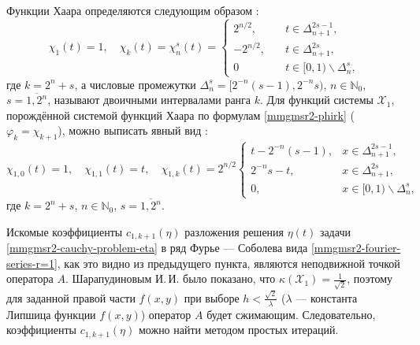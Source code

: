 Функции Хаара определяются следующим образом \cite{mmgmsr2-Kashin}:
\begin{equation}\label{mmgmsr2-haar-system}
\chi_1(t) = 1, \quad
\chi_k(t) = \chi_n^s(t)=
\begin{cases}
2^{n/2}, & \quad t \in \Delta^{2s-1}_{n+1}, \\
-2^{n/2}, & \quad t \in \Delta^{2s}_{n+1}, \\
0 & \quad t \in [0,1) \backslash \Delta^{s}_{n},
\end{cases}
\end{equation}
где $k=2^n+s$, а числовые промежутки $\Delta^{s}_n = [2^{-n}(s - 1), 2^{-n}s)$, $n \in \mathbb{N}_0$, $s = \overline{1, 2^n}$, называют двоичными интервалами ранга $k$. Для функций системы $\mathcal{X}_1$, порождённой системой функций Хаара по формулам \eqref{mmgmsr2-phirk} ($\varphi_k=\chi_{k+1}$), можно выписать явный вид \cite{mmgmsr2-SharapudinovMuratova,mmgmsr2-SHII-MSR-Demi2017}:
\begin{equation}\label{mmgmsr2-haar-sob-system}
\chi_{1,0}(t)=1, \quad
\chi_{1,1}(t)=t, \quad
\chi_{1,k}(t)=2^{n/2}
\begin{cases} %
t-2^{-n}(s-1), & x \in \Delta^{2s-1}_{n+1}, \\
2^{-n}s-t, & x \in \Delta^{2s}_{n+1}, \\
0, & x \in [0, 1)\backslash \Delta^{s}_{n}, %
\end{cases}
\end{equation}
где $k = 2^n+s$, $n \in \mathbb{N}_0$, $s = \overline{1, 2^n}$.

Искомые коэффициенты $c_{1,k+1}(\eta)$ разложения решения $\eta(t)$ задачи \eqref{mmgmsr2-cauchy-problem-eta} в ряд Фурье --- Соболева вида \eqref{mmgmsr2-fourier-series-r=1}, как это видно из предыдущего пункта, являются неподвижной точкой оператора $A$. Шарапудиновым И.\,И. было показано, что $\kappa(\mathcal{X}_1)=\frac{1}{\sqrt{2}}$, поэтому для заданной правой части $f(x,y)$ при выборе $h<\frac{\sqrt{2}}{\lambda}$ ($\lambda$ --- константа Липшица функции $f(x,y)$) оператор $A$ будет сжимающим. Следовательно, коэффициенты $c_{1,k+1}(\eta)$ можно найти методом простых итераций.

